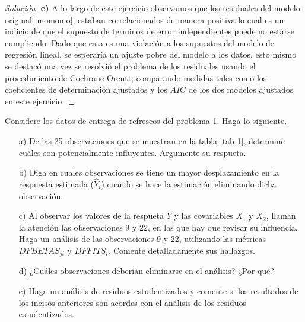 \documentclass[10.5pt,notitlepage]{article}
\newenvironment{solucion}
  {\begin{proof}[Solución]}
  {\end{proof}}
\theoremstyle{plain}
\begin{document}
\begin{solucion}
\noindent \textbf{e)} A lo largo de este ejercicio observamos que los residuales del modelo original \eqref{momomo}, estaban correlacionados de manera positiva lo cual es un indicio de que el supuesto de terminos de error independientes puede no estarse cumpliendo. Dado que esta es una violación a los supuestos del modelo de regresión lineal, se esperaría un ajuste pobre del modelo a los datos, esto mismo se destacó una vez se resolvió el problema de los residuales usando el procedimiento de Cochrane-Orcutt, comparando medidas tales como los coeficientes de determinación ajustados y los \(AIC\) de los dos modelos ajustados en este ejercicio.  
\end{solucion}
\begin{exo}
    Considere los datos de entrega de refrescos del problema 1. Haga lo siguiente.
    \begin{itemize}
        \item[a)] De las 25 observaciones que se muestran en la tabla \ref{tab 1}, determine cuáles son potencialmente influyentes. Argumente su respueta.
        \item[b)] Diga en cuales observaciones se tiene un mayor desplazamiento en la respuesta estimada ($\widehat{Y}_i$) cuando se hace la estimación eliminando dicha observación.
        \item[c)] Al observar los valores de la respueta $Y$ y las covariables $X_1$ y $X_2$, llaman la atención las observaciones 9 y 22, en las que hay que revisar su influencia. Haga un análisis de las observaciones 9 y 22, utilizando las métricas $DFBETAS_{ji}$ y $DFFITS_i$. Comente detalladamente sus hallazgos.
        \item[d)] ¿Cuáles observaciones deberían eliminarse en el análisis? ¿Por qué?
        \item[e)] Haga un análisis de residuos estudentizados y comente si los resultados de los incisos anteriores son acordes con el análisis de los residuos estudentizados.
    \end{itemize}
\end{exo}
\end{document}
